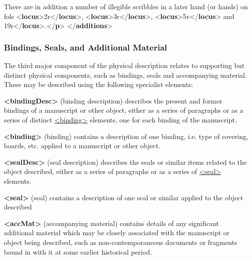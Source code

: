 \begin{shaded}
\mbox{}\newline 
{}There are in addition a number of illegible scribbles in a later hand (or\mbox{}\newline 
\hspace*{1em}\hspace*{1em} hands) on fols {<\textbf{locus}>}2r{</\textbf{locus}>}, {<\textbf{locus}>}3r{</\textbf{locus}>}, {<\textbf{locus}>}5v{</\textbf{locus}>} and\mbox{}\newline 
{}19r{</\textbf{locus}>}.{</\textbf{p}>}\mbox{}\newline 
{</\textbf{additions}>}\end{shaded}\egroup\par 
\subsubsection[{Bindings, Seals, and Additional Material}]{Bindings, Seals, and Additional Material}\label{msph3}\par
The third major component of the physical description relates to supporting but distinct physical components, such as bindings, seals and accompanying material. These may be described using the following specialist elements: 
\begin{sansreflist}
  
\item [\textbf{<bindingDesc>}] (binding description) describes the present and former bindings of a manuscript or other object, either as a series of paragraphs or as a series of distinct \hyperref[TEI.binding]{<binding>} elements, one for each binding of the manuscript.
\item [\textbf{<binding>}] (binding) contains a description of one binding, i.e. type of covering, boards, etc. applied to a manuscript or other object.
\item [\textbf{<sealDesc>}] (seal description) describes the seals or similar items related to the object described, either as a series of paragraphs or as a series of \hyperref[TEI.seal]{<seal>} elements.
\item [\textbf{<seal>}] (seal) contains a description of one seal or similar applied to the object described
\item [\textbf{<accMat>}] (accompanying material) contains details of any significant additional material which may be closely associated with the manuscript or object being described, such as non-contemporaneous documents or fragments bound in with it at some earlier historical period.
\end{sansreflist}

